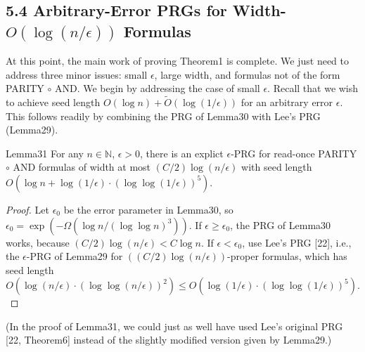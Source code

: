 \subsection*{5.4 Arbitrary-Error PRGs for Width-$O(\log(n/\epsilon))$ Formulas}
At this point, the main work of proving Theorem1 is complete. We just need to address three minor issues: small $\epsilon$, large width, and formulas not of the form PARITY $\circ$ AND. We begin by addressing the case of small $\epsilon$. Recall that we wish to achieve seed length $O(\log n)+\widetilde O(\log(1/\epsilon))$ for an arbitrary error $\epsilon$. This follows readily by combining the PRG of Lemma30 with Lee's PRG (Lemma29).
\begin{authorclaim}{Lemma31}
For any $n\in\mathbb N$, $\epsilon>0$, there is an explict $\epsilon$-PRG for read-once PARITY $\circ$ AND formulas of width at most $(C/2)\log(n/\epsilon)$ with seed length $O(\log n+\log(1/\epsilon)\cdot(\log\log(1/\epsilon))^5)$.
\end{authorclaim}
\begin{proof}
Let $\epsilon_0$ be the error parameter in Lemma30, so $\epsilon_0=\exp(-\Omega(\log n/(\log\log n)^3))$. If $\epsilon\ge\epsilon_0$, the PRG of Lemma30 works, because $(C/2)\log(n/\epsilon)<C\log n$. If $\epsilon<\epsilon_0$, use Lee's PRG [22], i.e., the $\epsilon$-PRG of Lemma29 for $((C/2)\log(n/\epsilon))$-proper formulas, which has seed length
\[
O(\log(n/\epsilon)\cdot(\log\log(n/\epsilon))^2)
\le O(\log(1/\epsilon)\cdot(\log\log(1/\epsilon))^5).
\]
\end{proof}
(In the proof of Lemma31, we could just as well have used Lee's original PRG [22, Theorem6] instead of the slightly modified version given by Lemma29.)
